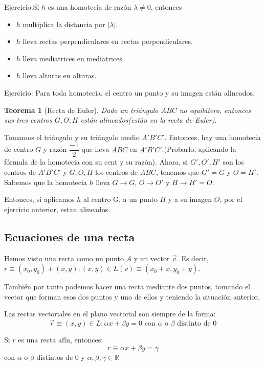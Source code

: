 \documentclass[11pt, a4paper, titlepage]{article}
\makeatletter
\renewenvironment{proof}[1][\proofname] {\vspace{-15pt}\par\pushQED{\qed}\normalfont\topsep6\p@\@plus6\p@\relax\trivlist\item[\hskip\labelsep\it#1\@addpunct{.}]\ignorespaces}{\popQED\endtrivlist\@endpefalse}
\newcommand{\R}{\mathbb{R}}
\renewcommand{\vec}{\overrightarrow}
\theoremstyle{theorem-style}
\newtheorem*{nth}{Teorema}
\theoremstyle{definition-style}
\theoremstyle{remark-style}
\theoremstyle{example-style}
\makeatother
\begin{document}
Ejercicio:Si $h$ es una homotecia de razón $\lambda\ne 0$, entonces 
\begin{itemize}
\item $h$ multiplica la distancia por $|\lambda|$.
\item $h$ lleva rectas perpendiculares en rectas perpendiculares.
\item $h$ lleva mediatrices en mediatrices.
\item $h$ lleva alturas en alturas.
\end{itemize}

Ejercicio: Para toda homotecia, el centro un punto y su imagen están alineados.


\begin{nth}[Recta de Euler]
  Dado un triángulo $ABC$ no equilátero, entonces sus tres centros $G,O,H$ están alineados(están en la recta de Euler).
\end{nth}
\begin{proof}
  Tomamos el triángulo y su triángulo medio $A'B'C'$. Entonces, hay una homotecia de centro $G$ y razón $\dfrac{-1}{2}$ que lleva $ABC$ en $A'B'C'$.(Probarlo, aplicando la fórmula de la homotecia con su cent y su razón). 
  Ahora, si $G',O',H'$ son los centros de $A'B'C'$ y $G,O,H$ los centros de $ABC$, tenemos que $G'=G$ y $O=H'$. Sabemos que la homotecia $h$ lleva $G \to G$, $O \to O'$ y $H \to H' = O$.
  
  Entonces, si aplicamos $h$ al centro G, a un punto $H$ y a su imagen $O$, por el ejercicio anterior, estan alineados.
  
\end{proof}



\subsection{Ecuaciones de una recta}
Hemos visto una recta como un punto $A$ y un vector $\vec{v}$. Es decir, $r \equiv (x_0,y_0) +(x,y) : (x,y) \in L(v) \equiv (x_0+x,y_0+y) $.

También por tanto podemos hacer una recta mediante dos puntos, tomando el vector que forman esos dos puntos y uno de ellos y teniendo la situación anterior.

Las rectas vectoriales en el plano vectorial son siempre de la forma:
\[
  \vec{r} \equiv (x,y) \in L : \alpha x + \beta y = 0 \text{  con $\alpha$ o $\beta$ distinto de 0}
\]

Si $r$ es una recta afín, entonces:
\[
  r \equiv \alpha x + \beta y = \gamma
\] con $\alpha$ o $\beta$ distintos de $0$ y $\alpha,\beta,\gamma \in \R$
\end{document}
